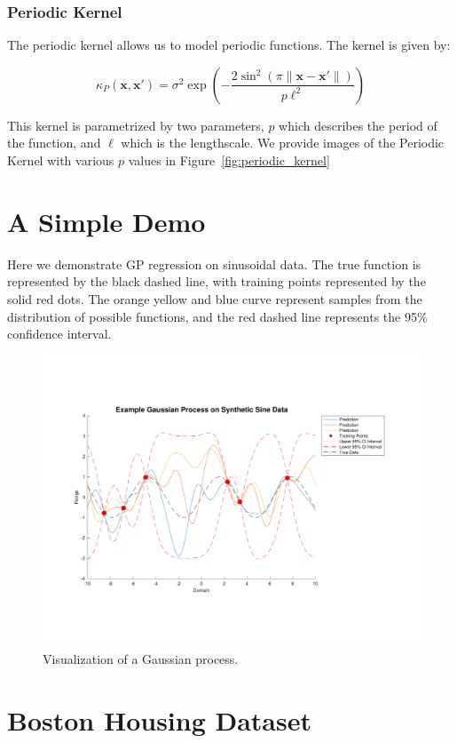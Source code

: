 \documentclass{article}
\newcommand{\bx}{\boldsymbol{x}}
\begin{document}
\subsubsection{Periodic Kernel}

The periodic kernel allows us to model periodic functions. The kernel is given by:

\[
  \kappa_{P}(\bx, \bx') = \sigma^{2}  \exp(- \frac{2 \sin^{2}(\pi \|\bx - \bx'\|)}{p \ell^{2}})
\]

This kernel is parametrized by two parameters, $p$ which describes the period of the function, and $\ell$ which is the
lengthscale\cite{duvenaud_automatic_2014}. We provide images of the Periodic Kernel with various $p$ values in
Figure~\ref{fig:periodic_kernel}


\section{A Simple Demo}
Here we demonstrate GP regression on sinusoidal data. The true function is represented by the black dashed line, with training points represented by the solid red dots. The orange yellow and blue curve represent samples from the distribution of possible functions, and the red dashed line represents the 95\% confidence interval.
\begin{figure}[!hp]
  \centering
  \caption{Visualization of a Gaussian process.  }
  \label{fig:synthetic_data}
  \includegraphics[clip,keepaspectratio=true,scale=0.5]{synthetic_data}
\end{figure}
\section{Boston Housing Dataset}
\end{document}
